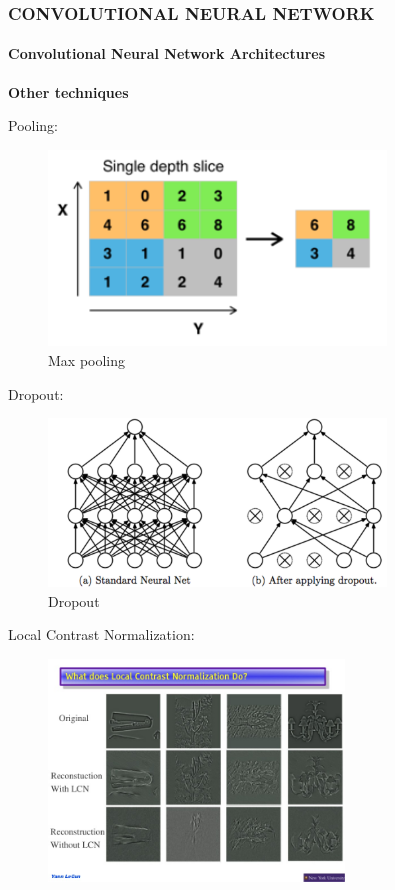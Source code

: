 \documentclass[11pt]{beamer}
\begin{document}
	\begin{frame}
		\frametitle{\textbf{CONVOLUTIONAL NEURAL NETWORK}}
		\framesubtitle{Convolutional Neural Network Architectures}
		\textbf{Other techniques}

		\begin{itemize}
			\begin{minipage}{0.45\textwidth}
				\item Pooling: 
				\begin{figure}[h!]
					\includegraphics[width=0.8\textwidth]{Max_pooling.png}
					\caption{Max pooling}
				\end{figure}
			\end{minipage}
			\begin{minipage}{0.45\textwidth}
				\item Dropout: 
				\begin{figure}[h!]
					\includegraphics[width=0.8\textwidth]{dropout.png}
					\caption{Dropout}
				\end{figure}
			\end{minipage}
			\begin{minipage}{0.45\textwidth}
				\item Local Contrast Normalization: 
				\begin{figure}[h!]
					\includegraphics[width=0.7\textwidth]{LCN.jpg}

\end{figure}
\end{minipage}
\end{itemize}
\end{frame}
\end{document}
